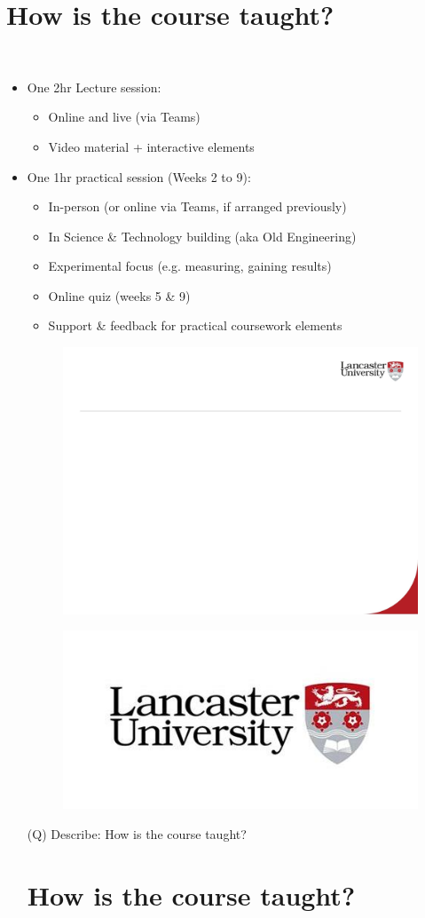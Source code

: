\documentclass[12pt]{article}
\begin{document}
\section{How is the course taught?}
\\
\begin{itemize}
  \item One 2hr Lecture session:
\begin{itemize}
  \item Online and live (via Teams)
  \item Video material + interactive elements
\end{itemize}
  \item One 1hr practical session (Weeks 2 to 9):
\begin{itemize}
  \item In-person (or online via Teams, if arranged previously)
  \item In Science \& Technology building (aka Old Engineering)
  \item Experimental focus (e.g. measuring, gaining results)
  \item Online quiz (weeks 5 \& 9)
  \item Support \& feedback for practical coursework elements
\end{itemize}
\begin{figure}[H]
\includegraphics[width=0.5\linewidth]{page4-image-1.png}
\end{figure}
\begin{figure}[H]
\includegraphics[width=0.5\linewidth]{page4-image-2.png}
\end{figure}
\clearpage
(Q)
Describe: How is the course taught?
\clearpage
\section{How is the course taught?}
\\
\end{itemize}
\end{document}
